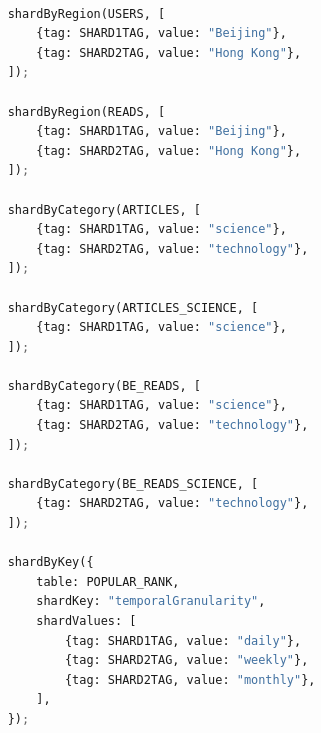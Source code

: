 \documentclass{article}
\begin{document}
    \begin{lstlisting}[language=Python, caption=Sharding of each collection]
   
    shardByRegion(USERS, [
        {tag: SHARD1TAG, value: "Beijing"},
        {tag: SHARD2TAG, value: "Hong Kong"},
    ]);
    
    shardByRegion(READS, [
        {tag: SHARD1TAG, value: "Beijing"},
        {tag: SHARD2TAG, value: "Hong Kong"},
    ]);
    
    shardByCategory(ARTICLES, [
        {tag: SHARD1TAG, value: "science"},
        {tag: SHARD2TAG, value: "technology"},
    ]);
    
    shardByCategory(ARTICLES_SCIENCE, [
        {tag: SHARD1TAG, value: "science"},
    ]);
    
    shardByCategory(BE_READS, [
        {tag: SHARD1TAG, value: "science"},
        {tag: SHARD2TAG, value: "technology"},
    ]);
    
    shardByCategory(BE_READS_SCIENCE, [
        {tag: SHARD2TAG, value: "technology"},
    ]); 
    
    shardByKey({
        table: POPULAR_RANK,
        shardKey: "temporalGranularity",
        shardValues: [
            {tag: SHARD1TAG, value: "daily"},
            {tag: SHARD2TAG, value: "weekly"},
            {tag: SHARD2TAG, value: "monthly"},
        ],
    });
    \end{lstlisting}
\end{document}
